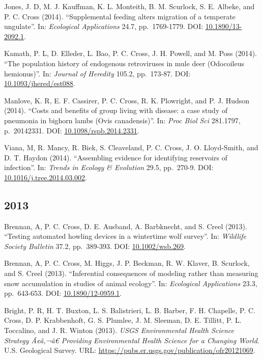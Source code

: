 \documentclass[12pt,]{article}
\begin{document}
Jones, J. D, M. J. Kauffman, K. L. Monteith, B. M. Scurlock, S. E.
Albeke, and P. C. Cross (2014). ``Supplemental feeding alters migration
of a temperate ungulate''. In: \emph{Ecological Applications} 24.7,
pp.~1769-1779. DOI:
\href{https://doi.org/10.1890\%2F13-2092.1}{10.1890/13-2092.1}.

Kamath, P. L, D. Elleder, L. Bao, P. C. Cross, J. H. Powell, and M. Poss
(2014). ``The population history of endogenous retroviruses in mule deer
(Odocoileus hemionus)''. In: \emph{Journal of Heredity} 105.2,
pp.~173-87. DOI:
\href{https://doi.org/10.1093\%2Fjhered\%2Fest088}{10.1093/jhered/est088}.

Manlove, K. R, E. F. Cassirer, P. C. Cross, R. K. Plowright, and P. J.
Hudson (2014). ``Costs and benefits of group living with disease: a case
study of pneumonia in bighorn lambs (Ovis canadensis)''. In: \emph{Proc
Biol Sci} 281.1797, p.~20142331. DOI:
\href{https://doi.org/10.1098\%2Frspb.2014.2331}{10.1098/rspb.2014.2331}.

Viana, M, R. Mancy, R. Biek, S. Cleaveland, P. C. Cross, J. O.
Lloyd-Smith, and D. T. Haydon (2014). ``Assembling evidence for
identifying reservoirs of infection''. In: \emph{Trends in Ecology \&
Evolution} 29.5, pp.~270-9. DOI:
\href{https://doi.org/10.1016\%2Fj.tree.2014.03.002}{10.1016/j.tree.2014.03.002}.

\hypertarget{section-6}{%
\subsection{2013}\label{section-6}}

Brennan, A, P. C. Cross, D. E. Ausband, A. Barbknecht, and S. Creel
(2013). ``Testing automated howling devices in a wintertime wolf
survey''. In: \emph{Wildlife Society Bulletin} 37.2, pp.~389-393. DOI:
\href{https://doi.org/10.1002\%2Fwsb.269}{10.1002/wsb.269}.

Brennan, A, P. C. Cross, M. Higgs, J. P. Beckman, R. W. Klaver, B.
Scurlock, and S. Creel (2013). ``Inferential consequences of modeling
rather than measuring snow accumulation in studies of animal ecology''.
In: \emph{Ecological Applications} 23.3, pp.~643-653. DOI:
\href{https://doi.org/10.1890\%2F12-0959.1}{10.1890/12-0959.1}.

Bright, P. R, H. T. Buxton, L. S. Balistrieri, L. B. Barber, F. H.
Chapelle, P. C. Cross, D. P. Krabbenhoft, G. S. Plumlee, J. M. Sleeman,
D. E. Tillitt, P. L. Toccalino, and J. R. Winton (2013). \emph{USGS
Environmental Health Science Strategy Ã¢â‚¬â€ Providing Environmental
Health Science for a Changing World}. U.S. Geological Survey. URL:
\url{https://pubs.er.usgs.gov/publication/ofr20121069}.
\end{document}
